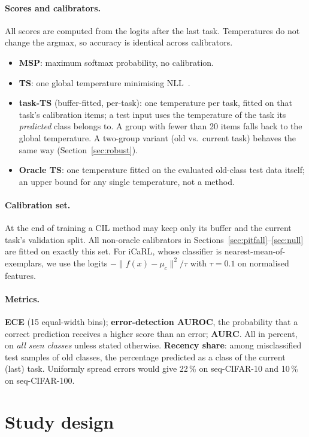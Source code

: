 \documentclass[11pt]{article}
\newcommand{\taskts}{task-TS}
\begin{document}
\paragraph{Scores and calibrators.} All scores are computed from the logits after the last task.
Temperatures do not change the argmax, so accuracy is identical across calibrators.
\begin{itemize}
\item \textbf{MSP}: maximum softmax probability, no calibration.
\item \textbf{TS}: one global temperature minimising NLL~\cite{guo2017calibration}.
\item \textbf{\taskts} (buffer-fitted, per-task): one temperature per task, fitted on that task's
  calibration items; a test input uses the temperature of the task its \emph{predicted} class belongs
  to. A group with fewer than 20 items falls back to the global temperature. A two-group variant
  (old vs.\ current task) behaves the same way (Section~\ref{sec:robust}).
\item \textbf{Oracle TS}: one temperature fitted on the evaluated old-class test data itself; an
  upper bound for any single temperature, not a method.
\end{itemize}
\paragraph{Calibration set.} At the end of training a CIL method may keep only its buffer and the
current task's validation split. All non-oracle calibrators in Sections~\ref{sec:pitfall}--\ref{sec:null}
are fitted on exactly this set. For iCaRL, whose classifier is nearest-mean-of-exemplars, we use the
logits $-\lVert f(x)-\mu_c\rVert^2/\tau$ with $\tau=0.1$ on normalised features.

\paragraph{Metrics.} \textbf{ECE} (15 equal-width bins); \textbf{error-detection AUROC}, the
probability that a correct prediction receives a higher score than an error; \textbf{AURC}. All in
percent, on \emph{all seen classes} unless stated otherwise. \textbf{Recency share}: among
misclassified test samples of old classes, the percentage predicted as a class of the current (last)
task. Uniformly spread errors would give 22\,\% on seq-CIFAR-10 and 10\,\% on seq-CIFAR-100.

\section{Study design}\label{sec:design}
\end{document}
